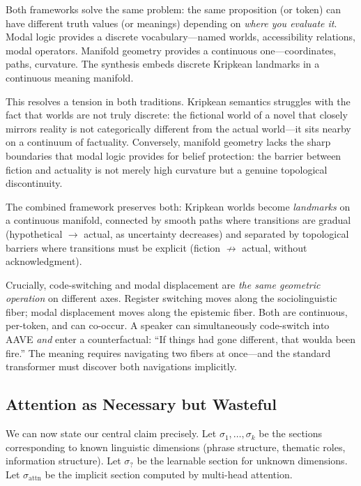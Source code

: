 \documentclass[11pt]{article}
\begin{document}
Both frameworks solve the same problem: the same proposition (or token) can 
have different truth values (or meanings) depending on \emph{where you 
evaluate it}. Modal logic provides a discrete vocabulary---named worlds, 
accessibility relations, modal operators. Manifold geometry provides a 
continuous one---coordinates, paths, curvature. The synthesis embeds discrete 
Kripkean landmarks in a continuous meaning manifold.

This resolves a tension in both traditions. Kripkean semantics struggles with 
the fact that worlds are not truly discrete: the fictional world of a novel 
that closely mirrors reality is not categorically different from the actual 
world---it sits nearby on a continuum of factuality. Conversely, manifold 
geometry lacks the sharp boundaries that modal logic provides for belief 
protection: the barrier between fiction and actuality is not merely high 
curvature but a genuine topological discontinuity.

The combined framework preserves both: Kripkean worlds become \emph{landmarks} 
on a continuous manifold, connected by smooth paths where transitions are 
gradual (hypothetical $\to$ actual, as uncertainty decreases) and separated by 
topological barriers where transitions must be explicit (fiction $\not\to$ 
actual, without acknowledgment).

Crucially, code-switching and modal displacement are \emph{the same geometric 
operation} on different axes. Register switching moves along the sociolinguistic 
fiber; modal displacement moves along the epistemic fiber. Both are continuous, 
per-token, and can co-occur. A speaker can simultaneously code-switch into AAVE 
\emph{and} enter a counterfactual: ``If things had gone different, that woulda 
been fire.'' The meaning requires navigating two fibers at once---and the 
standard transformer must discover both navigations implicitly.

\subsection{Attention as Necessary but Wasteful}
\label{sec:wasteful}

We can now state our central claim precisely. Let $\sigma_1, \ldots, \sigma_k$ 
be the sections corresponding to known linguistic dimensions (phrase structure, 
thematic roles, information structure). Let $\sigma_?$ be the learnable section 
for unknown dimensions. Let $\sigma_{\text{attn}}$ be the implicit section 
computed by multi-head attention.
\end{document}
